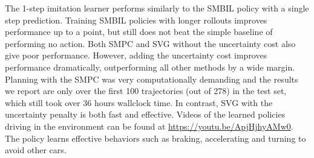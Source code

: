 \documentclass{article} %
\begin{document}

  The 1-step imitation learner performs similarly to the SMBIL policy with a single step prediction.
  Training SMBIL policies with longer rollouts improves performance up to a point, but still does not beat the simple baseline of performing no action.
  Both SMPC and SVG without the uncertainty cost also give poor performance.
  However, adding the uncertainty cost improves performance dramatically, outperforming all other methods by a wide margin.
  Planning with the SMPC was very computationally demanding and the results we report are only over the first 100 trajectories (out of 278) in the test set, which still took over 36 hours wallclock time.
  In contrast, SVG with the uncertainty penalty is both fast and effective.
  Videos of the learned policies driving in the environment can be found at \url{https://youtu.be/ApjHjhyAMw0}.
  The policy learns effective behaviors such as braking, accelerating and turning to avoid other cars.
\end{document}

